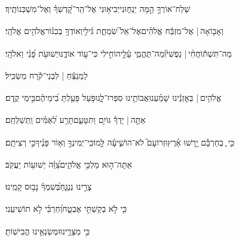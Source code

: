 \documentclass[12pt]{article}
\newcommand{\loc}[1]{\textsuperscript{\locf{#1}}}
\begin{document}
{\loc{ ג}~}‏שְׁלַח־אוֹרְךָ֣  הֵ֣מָּה יַנְח֑וּנִי{\hfill}יְבִיא֥וּנִי אֶל־הַֽר־קׇ֝דְשְׁךָ֗ וְאֶל־מִשְׁכְּנוֹתֶֽיךָ׃\par

{\loc{ ד}~}‏וְאָב֤וֹאָה |  אֶל־מִזְבַּ֬ח אֱלֹהִ֗ים{\hfill}אֶל־אֵל֮ שִׂמְחַ֢ת גִּ֫ילִ֥י\newline\hspace*{.5em}וְאוֹדְךָ֥ בְכִנּ֗וֹר{\hfill}אֱלֹהִ֥ים אֱלֹהָֽי׃\par

{\loc{ ה}~}‏מַה־תִּשְׁתּ֬וֹחֲחִ֨י |  נַפְשִׁי֮{\hfill}וּֽמַה־תֶּהֱמִ֢י עָ֫לָ֥י\newline\hspace*{.5em}הוֹחִ֣ילִי  כִּי־ע֣וֹד אוֹדֶ֑נּוּ{\hfill}יְשׁוּעֹ֥ת פָּ֝נַ֗י וֵאלֹהָֽי׃\par\pend
\ledpb
\pstart[\subsection*{\textcolor{red}{פרק מד}}]\label{פרק מד}
{\loc{ א}~}‏לַמְנַצֵּ֬חַ | לִבְנֵי־קֹ֬רַח מַשְׂכִּֽיל׃\par

{\loc{ ב}~}‏אֱלֹהִ֤ים |  בְּאׇזְנֵ֬ינוּ שָׁמַ֗עְנוּ{\hfill}אֲבוֹתֵ֥ינוּ סִפְּרוּ־לָ֑נוּ\newline\hspace*{.5em}פֹּ֥עַל פָּעַ֥לְתָּ בִ֝ימֵיהֶ֗ם{\hfill}בִּ֣ימֵי קֶֽדֶם׃\par

{\loc{ ג}~}‏אַתָּ֤ה |  יָדְךָ֡ גּוֹיִ֣ם  וַתִּטָּעֵ֑ם{\hfill}תָּרַ֥ע לְ֝אֻמִּ֗ים וַֽתְּשַׁלְּחֵֽם׃\par

{\loc{ ד}~}‏כִּ֤י ֪ בְחַרְבָּ֡ם יָ֥רְשׁוּ אָ֗רֶץ{\hfill}וּזְרוֹעָם֮ לֹא־הוֹשִׁ֢יעָ֫ה לָּ֥מוֹ\newline\hspace*{.5em}כִּֽי־יְמִינְךָ֣  וְא֥וֹר פָּנֶ֗יךָ{\hfill}כִּ֣י רְצִיתָֽם׃\par

{\loc{ ה}~}‏אַתָּה־ה֣וּא מַלְכִּ֣י אֱלֹהִ֑ים{\hfill}צַ֝וֵּ֗ה יְשׁוּע֥וֹת יַעֲקֹֽב׃\par

{\loc{ ו}~}‏ צָרֵ֣ינוּ נְנַגֵּ֑חַ{\hfill}בְּ֝שִׁמְךָ֗ נָב֥וּס קָמֵֽינוּ׃\par

{\loc{ ז}~}‏כִּ֤י לֹ֣א בְקַשְׁתִּ֣י אֶבְטָ֑ח{\hfill}וְ֝חַרְבִּ֗י לֹ֣א תוֹשִׁיעֵֽנִי׃\par

{\loc{ ח}~}‏כִּ֣י  מִצָּרֵ֑ינוּ{\hfill}וּמְשַׂנְאֵ֥ינוּ הֱבִישֽׁוֹתָ׃\par
\end{document}
